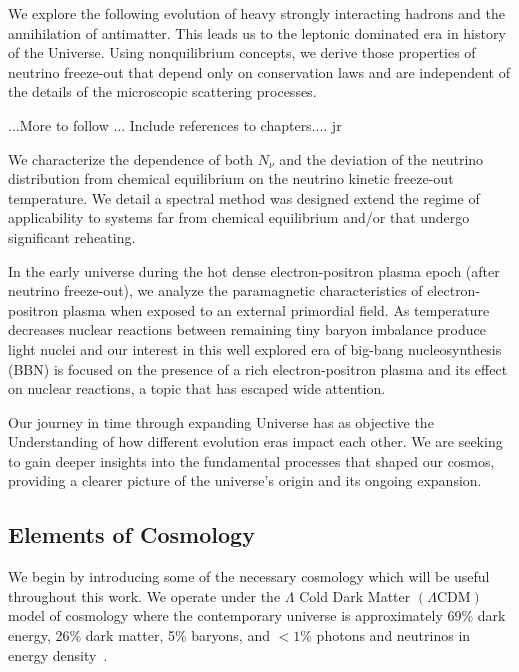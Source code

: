 We explore the following evolution of heavy strongly interacting hadrons and the annihilation of antimatter. This leads us to the leptonic dominated era in history of the Universe. Using nonquilibrium concepts, we derive those properties of neutrino freeze-out that depend only on conservation laws and are independent of the details of the microscopic scattering processes. 


...More to follow ... Include references to chapters.... jr


We characterize the dependence of both $N_\nu$ and the deviation of the neutrino distribution from chemical equilibrium on the neutrino kinetic freeze-out temperature. We detail a spectral method was designed extend the regime of applicability to systems far from chemical equilibrium and/or that undergo significant reheating. 

In the early universe during the hot dense electron-positron plasma epoch (after neutrino freeze-out), we analyze the paramagnetic characteristics of electron-positron plasma when exposed to an external primordial field. As temperature decreases nuclear reactions between remaining tiny baryon imbalance produce light nuclei and our interest in this well explored era of big-bang nucleosynthesis (BBN) is focused on the presence of a rich electron-positron plasma and its effect on nuclear reactions, a topic that has escaped wide attention. 

Our journey in time through expanding Universe has as objective the Understanding of how different evolution eras impact each other. We are seeking to gain deeper insights into the fundamental processes that shaped our cosmos, providing a clearer picture of the universe's origin and its ongoing expansion.

\subsection{Elements of Cosmology}
\label{sec:flrw}
We begin by introducing some of the necessary cosmology which will be useful throughout this work. We operate under the $\Lambda$ Cold Dark Matter $(\Lambda\mathrm{CDM})$ model of cosmology where the contemporary universe is approximately 69\% dark energy, 26\% dark matter, 5\% baryons, and $<1$\% photons and neutrinos in energy density~\cite{Davis:2003ad,Planck:2018vyg}.

